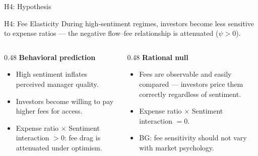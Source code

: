 \documentclass[10pt, aspectratio=169]{beamer}
\begin{document}
\begin{frame}{H4: Hypothesis}
  \begin{block}{H4: Fee Elasticity}
    During high-sentiment regimes, investors become less sensitive to expense ratios
    — the negative flow–fee relationship is attenuated ($\psi > 0$).
  \end{block}
  \vspace{8pt}
  \begin{columns}[T]
    \begin{column}{0.48\textwidth}
      \small\textbf{Behavioral prediction}
      \begin{itemize}\itemsep3pt
        \item High sentiment inflates perceived manager quality.
        \item Investors become willing to pay higher fees for access.
        \item Expense ratio $\times$ Sentiment interaction $> 0$: fee drag is attenuated under optimism.
      \end{itemize}
    \end{column}
    \begin{column}{0.48\textwidth}
      \small\textbf{Rational null}
      \begin{itemize}\itemsep3pt
        \item Fees are observable and easily compared — investors price them correctly regardless of sentiment.
        \item Expense ratio $\times$ Sentiment interaction $= 0$.
        \item BG: fee sensitivity should not vary with market psychology.
      \end{itemize}
    \end{column}
  \end{columns}
\end{frame}
\end{document}
